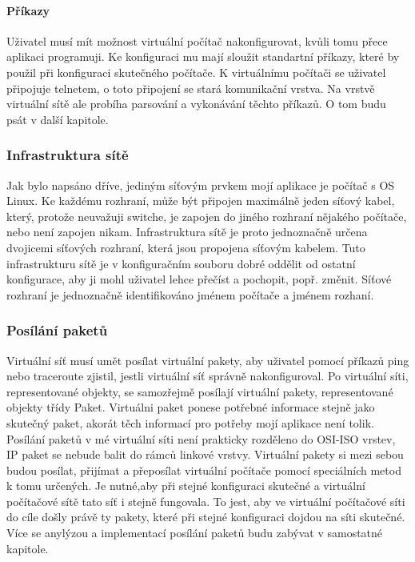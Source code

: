 \paragraph{Příkazy}		%
Uživatel musí mít možnost virtuální počítač nakonfigurovat, kvůli tomu přece aplikaci programuji. Ke konfiguraci mu mají sloužit standartní příkazy, které by použil při konfiguraci skutečného počítače. K virtuálnímu počítači se uživatel připojuje telnetem, o toto připojení se stará komunikační vrstva. Na vrstvě virtuální sítě ale probíha parsování a vykonávání těchto příkazů. O tom budu psát v další kapitole.
\subsubsection{Infrastruktura sítě}		%
Jak bylo napsáno dříve, jediným síťovým prvkem mojí aplikace je počítač s OS Linux. Ke každému rozhraní, může být připojen maximálně jeden síťový kabel, který, protože neuvažuji switche, je zapojen do jiného rozhraní nějakého počítače, nebo není zapojen nikam.  Infrastruktura sítě je proto jednoznačně určena dvojicemi síťových rozhraní, která jsou propojena síťovým kabelem. Tuto infrastrukturu sítě je v konfiguračním souboru dobré oddělit od ostatní konfigurace, aby ji mohl uživatel lehce přečíst a pochopit, popř. změnit. Síťové rozhraní je jednoznačně identifikováno jménem počítače a jménem rozhaní.
\subsubsection{Posílání paketů}		%
Virtuální síť musí umět posílat virtuální pakety, aby uživatel pomocí příkazů ping nebo traceroute zjistil, jestli virtuální síť správně nakonfiguroval. Po virtuální síti, representované objekty, se samozřejmě posílají virtuální pakety, representované objekty třídy Paket. Virtuálni paket ponese potřebné informace stejně jako skutečný paket, akorát těch informací pro potřeby mojí aplikace není tolik. Posílání paketů v mé virtuální síti není prakticky rozděleno do OSI-ISO vrstev, IP paket se nebude balit do rámců linkové vrstvy. Virtuální pakety si mezi sebou budou posílat, přijímat a přeposílat virtuální počítače pomocí speciálních metod k tomu určených. Je nutné,aby při stejné konfiguraci skutečné a virtuální počítačové sítě tato síť i stejně fungovala. To jest, aby ve virtuální počítačové síti do cíle došly právě ty pakety, které při stejné konfiguraci dojdou na síti skutečné. Více se anylýzou a implementací posílání paketů budu zabývat v samostatné kapitole.

